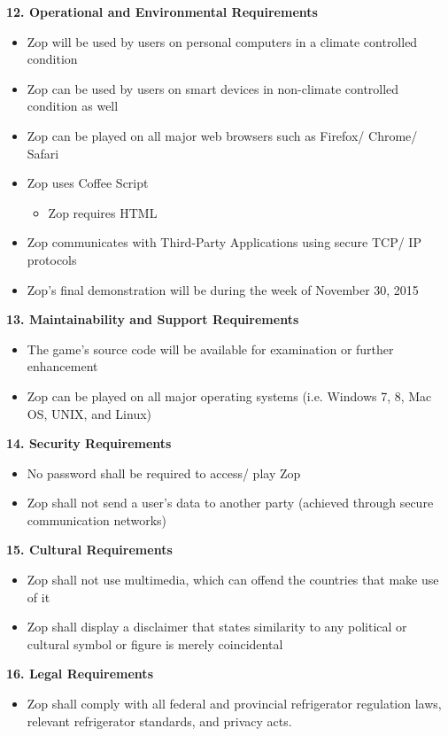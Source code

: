 \documentclass[12pt]{article}
\begin{document}
\textbf{12. Operational and Environmental Requirements}\\
\begin{itemize}
 \item Zop will be used by users on personal computers in a climate controlled condition
 \item Zop can be used by users on smart devices in non-climate controlled condition as well
 \item Zop can be played on all major web browsers such as Firefox/ Chrome/ Safari
 \item Zop uses Coffee Script
  \begin{itemize}
   \item Zop requires HTML
  \end{itemize}
 \item Zop communicates with Third-Party Applications using secure TCP/ IP protocols
 \item Zop’s final demonstration will be during the week of November 30, 2015
\end{itemize} 
\textbf{13. Maintainability and Support Requirements}\\
\begin{itemize}
 \item The game’s source code will be available for examination or further enhancement
 \item Zop can be played on all major operating systems (i.e. Windows 7, 8, Mac OS, UNIX, and Linux)
\end{itemize}
\textbf{14. Security Requirements}\\
\begin{itemize}
 \item No password shall be required to access/ play Zop
 \item Zop shall not send a user’s data to another party (achieved through secure communication networks)
\end{itemize}
\textbf{15. Cultural Requirements}\\
\begin{itemize}
 \item Zop shall not use multimedia, which can offend the countries that make use of it
 \item Zop shall display a disclaimer that states similarity to any political or cultural symbol or figure is merely coincidental
\end{itemize}
\textbf{16. Legal Requirements}\\
\begin{itemize}
 \item Zop shall comply with all federal and provincial refrigerator regulation laws, relevant refrigerator standards, and privacy acts.
\end{itemize}
\end{document}
